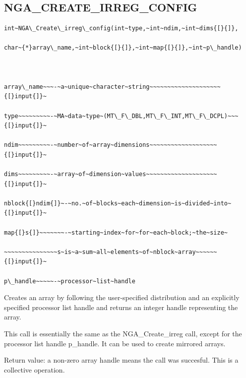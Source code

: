\subsection*{\label{sub:NGA_CREATE_IRREG_CONFIG}NGA\_CREATE\_IRREG\_CONFIG}
\begin{verbatim}
int~NGA\_Create\_irreg\_config(int~type,~int~ndim,~int~dims{[}{]},

char~{*}array\_name,~int~block{[}{]},~int~map{[}{]},~int~p\_handle)



array\_name~~~-~a~unique~character~string~~~~~~~~~~~~~~~~~~~~{[}input{]}~

type~~~~~~~~~-~MA~data~type~(MT\_F\_DBL,MT\_F\_INT,MT\_F\_DCPL)~~~{[}input{]}~

ndim~~~~~~~~~-~number~of~array~dimensions~~~~~~~~~~~~~~~~~~~{[}input{]}~

dims~~~~~~~~~-~array~of~dimension~values~~~~~~~~~~~~~~~~~~~~{[}input{]}~

nblock{[}ndim{]}~-~no.~of~blocks~each~dimension~is~divided~into~{[}input{]}~

map{[}s{]}~~~~~~~-~starting~index~for~for~each~block;~the~size~

~~~~~~~~~~~~~~~s~is~a~sum~all~elements~of~nblock~array~~~~~~{[}input{]}~

p\_handle~~~~~-~processor~list~handle
\end{verbatim}
Creates an array by following the user-specified distribution and
an explicitly specified processor list handle and returns an integer
handle representing the array.

This call is essentially the same as the NGA\_Create\_irreg call,
except for the processor list handle p\_handle. It can be used to
create mirrored arrays.

Return value: a non-zero array handle means the call was succesful.
This is a collective operation. 


